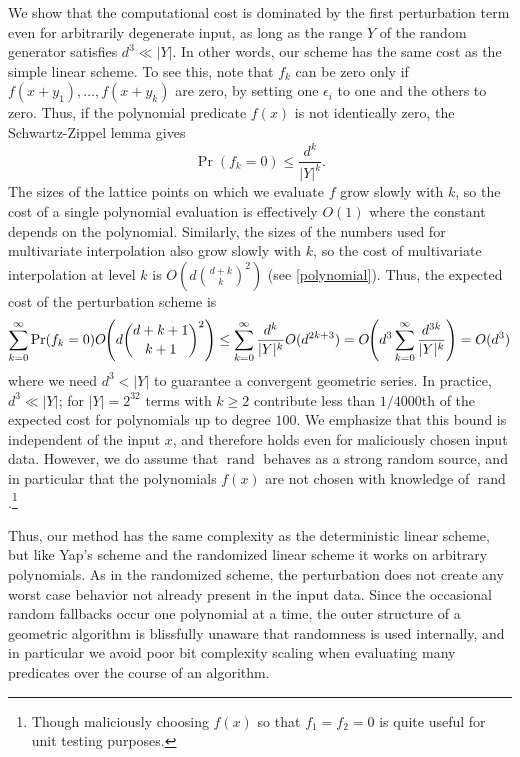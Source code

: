 \documentclass[11pt]{article}
\newcommand{\rand}{\operatorname{rand}}
\begin{document}
We show that the computational cost is dominated by the first perturbation term even for arbitrarily degenerate input, as long as the range $Y$ of the random generator
satisfies $d^3 \ll |Y|$.  In other words, our scheme has the same cost as the simple linear scheme.  To see this, note that $f_k$ can be zero only if $f(x + y_1), \ldots, f(x + y_k)$ are zero,
by setting one $\epsilon_i$ to one and the others to zero.  Thus, if the polynomial predicate $f(x)$ is not identically zero, the Schwartz-Zippel lemma gives
$$\Pr(f_k = 0) \le \frac{d^k}{|Y|^k}.$$
The sizes of the lattice points on which we evaluate $f$ grow slowly with $k$, so the cost of a single polynomial evaluation is effectively $O(1)$ where the constant depends on the
polynomial.  Similarly, the sizes of the numbers used for multivariate interpolation also grow slowly with $k$, so the cost of multivariate
interpolation at level $k$ is $O\left(d \binom{d + k}{k}^2\right)$ (see \autoref{polynomial}).  Thus, the expected cost of the perturbation scheme is
\begin{align} \label{cost}
\sum_{k = 0}^\infty \Pr(f_k = 0) O\hspace{-.25em}\left(d \binom{d + k + 1}{k + 1}^2\right) \le \sum_{k = 0}^\infty \frac{d^k}{|Y|^k} O(d^{2k+3})
  = O\hspace{-.25em}\left(d^3 \sum_{k = 0}^\infty \frac{d^{3k}}{|Y|^k} \right) = O(d^3)
\end{align}
where we need $d^3 < |Y|$ to guarantee a convergent geometric series.  In practice, $d^3 \ll |Y|$; for $|Y| = 2^{32}$ terms with $k \ge 2$ contribute less than $1/4000$th of the expected cost
for polynomials up to degree $100$.  We emphasize that this bound is independent of the input $x$, and therefore holds even for maliciously chosen input data.  However, we do
assume that $\rand$ behaves as a strong random source, and in particular that the polynomials $f(x)$ are not chosen with knowledge of $\rand$.\footnote{Though maliciously
choosing $f(x)$ so that $f_1 = f_2 = 0$ is quite useful for unit testing purposes.}

Thus, our method has the same complexity as the deterministic linear scheme, but like Yap's scheme and the randomized linear scheme it works on arbitrary polynomials.  As in the
randomized scheme, the perturbation does not create any worst case behavior not already present in the input data.  Since the occasional random fallbacks occur one
polynomial at a time, the outer structure of a geometric algorithm is blissfully unaware that randomness is used internally, and in particular we avoid poor bit complexity
scaling when evaluating many predicates over the course of an algorithm.
\end{document}
